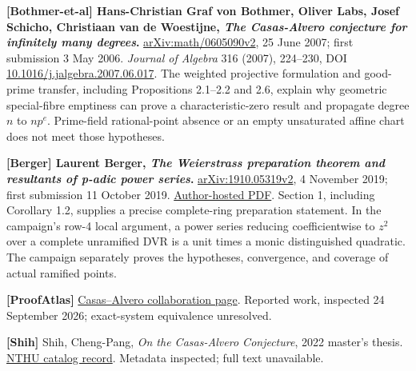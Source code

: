 \documentclass[
  british,
  10pt,
]{article}
\begin{document}
\textbf{{[}Bothmer-et-al{]} Hans-Christian Graf von Bothmer, Oliver
Labs, Josef Schicho, Christiaan van de Woestijne, \emph{The Casas-Alvero
conjecture for infinitely many degrees}.}
\href{https://arxiv.org/abs/math/0605090v2}{arXiv:math/0605090v2}, 25
June 2007; first submission 3 May 2006. \emph{Journal of Algebra} 316
(2007), 224--230, DOI
\href{https://doi.org/10.1016/j.jalgebra.2007.06.017}{10.1016/j.jalgebra.2007.06.017}.
The weighted projective formulation and good-prime transfer, including
Propositions 2.1--2.2 and 2.6, explain why geometric special-fibre
emptiness can prove a characteristic-zero result and propagate degree
\(n\) to \(np^e\). Prime-field rational-point absence or an empty
unsaturated affine chart does not meet those hypotheses.

\textbf{{[}Berger{]} Laurent Berger, \emph{The Weierstrass preparation
theorem and resultants of p-adic power series}.}
\href{https://arxiv.org/abs/1910.05319v2}{arXiv:1910.05319v2}, 4
November 2019; first submission 11 October 2019.
\href{https://perso.ens-lyon.fr/laurent.berger/articles/article33.pdf}{Author-hosted
PDF}. Section 1, including Corollary 1.2, supplies a precise
complete-ring preparation statement. In the campaign's row-4 local
argument, a power series reducing coefficientwise to \(z^2\) over a
complete unramified DVR is a unit times a monic distinguished quadratic.
The campaign separately proves the hypotheses, convergence, and coverage
of actual ramified points.

\textbf{{[}ProofAtlas{]}}
\href{https://www.proofatlas.ai/collaboration/casas-alvero-conjecture/}{Casas--Alvero
collaboration page}. Reported work, inspected 24 September 2026;
exact-system equivalence unresolved.

\textbf{{[}Shih{]}} Shih, Cheng-Pang, \emph{On the Casas-Alvero
Conjecture}, 2022 master's thesis.
\href{https://etd.lib.nycu.edu.tw/cgi-bin/gs32/hugsweb.cgi?o=dnthucdr&s=id\%3D\%22G021090215100\%22.&searchmode=basic}{NTHU
catalog record}. Metadata inspected; full text unavailable.
\end{document}
